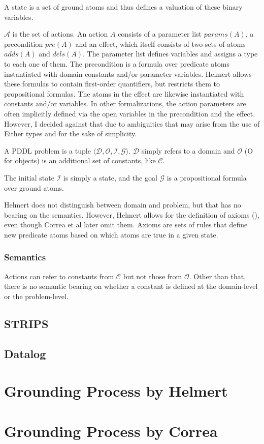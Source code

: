 A state is a set of ground atoms and thus defines a valuation of these binary variables.

$\mathcal A$ is the set of actions. An action $A$ consists of a parameter list $\mathit{params}(A)$, a precondition $\mathit{pre}(A)$ and an effect, which itself consists of two sets of atoms $\mathit{adds}(A)$ and $\mathit{dels}(A)$.
The parameter list defines variables and assigns a type to each one of them.
The precondition is a formula over predicate atoms instantiated with domain constants and/or parameter variables.
Helmert allows these formulas to contain first-order quantifiers, but \cite{AbLa} restricts them to propositional formulas.
The atoms in the effect are likewise instantiated with constants and/or variables.
In other formalizations, the action parameters are often implicitly defined via the open variables in the precondition and the effect. However, I decided against that due to ambiguities that may arise from the use of Either types and for the sake of simplicity.

A PDDL problem is a tuple $\langle\mathcal D, \mathcal O, \mathcal I, \mathcal G\rangle$. $\mathcal D$ simply refers to a domain and $\mathcal O$ (O for objects) is an additional set of constants, like $\mathcal C$.

The initial state $\mathcal I$ is simply a state, and the goal $\mathcal G$ is a propositional formula over ground atoms.

Helmert does not distinguish between domain and problem, but that has no bearing on the semantics.
However, Helmert allows for the definition of axioms (), even though Correa et al later omit them. Axioms are sets of rules that define new predicate atoms based on which atoms are true in a given state.

\subsubsection{Semantics}

Actions can refer to constants from $\mathcal C$ but not those from $\mathcal O$. Other than that, there is no semantic bearing on whether a constant is defined at the domain-level or the problem-level.




\subsection{STRIPS}


\subsection{Datalog}

\section{Grounding Process by Helmert}

\section{Grounding Process by Correa}